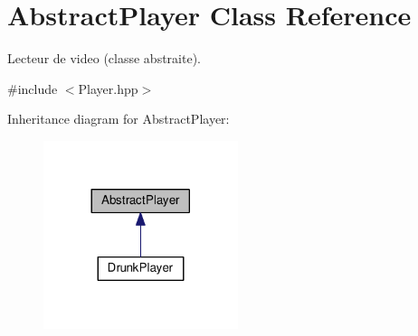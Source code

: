 \hypertarget{classAbstractPlayer}{\section{Abstract\+Player Class Reference}
\label{classAbstractPlayer}
}


Lecteur de video (classe abstraite).  




{\ttfamily \#include $<$Player.\+hpp$>$}



Inheritance diagram for Abstract\+Player\+:\nopagebreak
\begin{figure}[H]
\begin{center}
\leavevmode
\includegraphics[width=161pt]{classAbstractPlayer__inherit__graph}
\end{center}
\end{figure}
